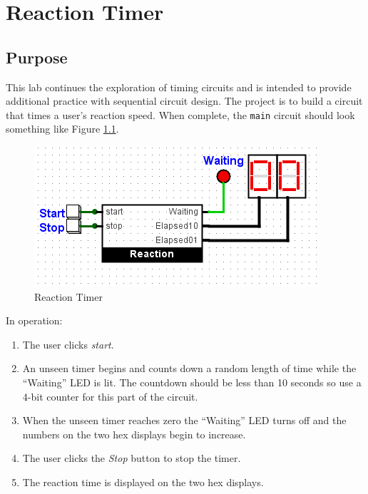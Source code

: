 \chapter{Reaction Timer}

\section{Purpose}

This lab continues the exploration of timing circuits and is intended to provide additional practice with sequential circuit design. The project is to build a circuit that times a user's reaction speed. When complete, the \lstinline[columns=fixed]|main| circuit should look something like Figure \ref{fig:08-01}.

\begin{figure}[H]
	\centering
	\includegraphics[width=\maxwidth{.95\linewidth}]{gfx/08-01}
	\caption{Reaction Timer}
	\label{fig:08-01}
\end{figure}

In operation:

\begin{enumerate}
	\item The user clicks \textit{start}. 
	\item An unseen timer begins and counts down a random length of time while the ``Waiting'' LED is lit. The countdown should be less than 10 seconds so use a 4-bit counter for this part of the circuit.
	\item When the unseen timer reaches zero the ``Waiting'' LED turns off and the numbers on the two hex displays begin to increase.
	\item The user clicks the \textit{Stop} button to stop the timer.
	\item The reaction time is displayed on the two hex displays.
\end{enumerate}

